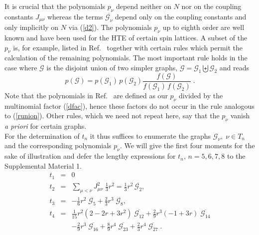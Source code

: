 \documentclass[aps,twocolumn,groupedaddress]{revtex4}
\begin{document}
It is crucial that the polynomials $p_\nu$ depend neither on $N$ nor
on the coupling constants $J_{\mu\nu}$ whereas the terms
$\overline{{\mathcal G}_\nu}$ depend only on the coupling constants
and only implicitly on $N$ via (\ref{d2}). The polynomials $p_\nu$
up to eighth order are well known and have been used for the HTE of
certain spin lattices.  A subset of the $p_\nu$ is, for example,
listed in Ref.~\cite{domb_green} together with certain rules which permit
the calculation of the remaining polynomials. The most important
rule holds in the case where ${\mathcal G}$ is the disjoint union of
two simpler graphs, ${\mathcal G}={\mathcal G}_1 \biguplus {\mathcal
G}_2$ and reads
\begin{equation}\label{runion}
p({\mathcal G})=p({\mathcal G}_1)\,p({\mathcal G}_2)
\frac{f({\mathcal G})}{f({\mathcal G}_1)\,f({\mathcal G}_2)}
\;.
\end{equation}
Note that the polynomials in Ref.~\cite{domb_green} are defined as our
$p_\nu$ divided by the multinomial factor (\ref{dfac}), hence these
factors do not occur in the rule analogous to (\ref{runion}). Other
rules, which we need not repeat here, say that the $p_\nu$ vanish
{\it a priori} for certain graphs.\\


For the determination of $t_n$ it thus suffices to enumerate the
graphs ${\mathcal G}_\nu, \;\nu\in T_n$ and the corresponding
polynomials $p_\nu$. We will give the first four moments for the
sake of illustration and defer the lengthy expressions for
$t_n,\,n=5,6,7,8$ to the Supplemental Material 1.\cite{supp1}
\begin{eqnarray}\label{rta}
t_1&=&0\\ \label{rtb} t_2&=&
\sum_{\mu<\nu}J_{\mu\nu}^2\;\frac{1}{3}r^2=
\frac{1}{3}r^2\,\overline{{\mathcal G}_2},\\  \label{rtc} t_3&=&
-\frac{1}{6} r^2\; \overline{{\mathcal G}_5} + \frac{2}{3} r^3
\;\overline{{\mathcal G}_8},\\ \nonumber
 t_4&=& \frac{1}{15}r^2 (2
-2 r + 3 r^2)\; \overline{{\mathcal G}_{12}} +\frac{2}{9}r^3(-1 + 3
r)\; \overline{{\mathcal G}_{14}}\\ \label{rtd} && -\frac{2}{9}
r^3\;\overline{{\mathcal G}_{16}} +\frac{8}{9} r^4\;\overline{{\mathcal G}_{23}}
+\frac{2}{3} r^4\;\overline{{\mathcal G}_{27}}\;.
\end{eqnarray}
\end{document}
